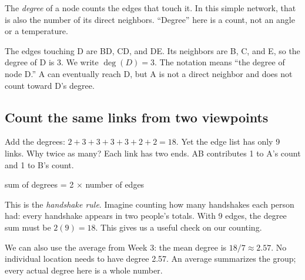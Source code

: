 \documentclass[11pt,letterpaper]{article}
\begin{document}
The \emph{degree} of a node counts the edges that touch it. In this simple network, that is also the number of its direct neighbors. ``Degree'' here is a count, not an angle or a temperature.



\begin{tcolorbox}[title={Example \textperiodcentered{} Count the school's contacts},breakable]

The edges touching D are BD, CD, and DE. Its neighbors are B, C, and E, so the degree of D is 3. We write \(\deg(D)=3\). The notation means ``the degree of node D.'' A can eventually reach D, but A is not a direct neighbor and does not count toward D's degree.


\end{tcolorbox}


\par{}\par\medskip


\subsection*{Count the same links from two viewpoints}

Add the degrees: \(2+3+3+3+3+2+2=18\). Yet the edge list has only 9 links. Why twice as many? Each link has two ends. AB contributes 1 to A's count and 1 to B's count.


sum of degrees = 2 $\times$ number of edges

This is the \emph{handshake rule}. Imagine counting how many handshakes each person had: every handshake appears in two people's totals. With 9 edges, the degree sum must be \(2(9)=18\). This gives us a useful check on our counting.



We can also use the average from Week 3: the mean degree is \(18/7\approx2.57\). No individual location needs to have degree 2.57. An average summarizes the group; every actual degree here is a whole number.
\end{document}
